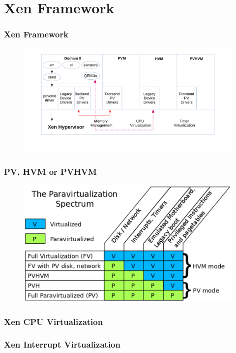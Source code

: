 \documentclass[aspectratio=169]{beamer}
\begin{document}
\section{Xen Framework}
\begin{frame}
\frametitle{Xen Framework}
\begin{figure}
\includegraphics[width=1.0\linewidth]{figures/xen.pdf}
\end{figure}
\end{frame}


\begin{frame}
\frametitle{PV, HVM or PVHVM}
\begin{figure}
\includegraphics[width=0.8\linewidth]{figures/spectrum.pdf}
\end{figure}
\end{frame}


\begin{frame}
\frametitle{Xen CPU Virtualization}
\end{frame}


\begin{frame}
\frametitle{Xen Interrupt Virtualization}
\end{frame}
\end{document}

